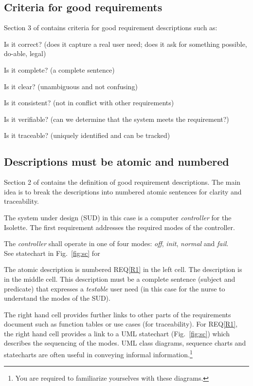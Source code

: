 \subsection{Criteria for good requirements}

Section 3 of \cite{telelogic} contains criteria for good requirement descriptions such as:

\begin{mylist}
\item Is it correct? (does it capture a real user need; does it ask for something possible, do-able, legal)
\item Is it complete? (a complete sentence)
\item Is it clear? (unambiguous and not confusing)
\item  Is it consistent? (not in conflict with other requirements)
\item  Is it verifiable? (can we determine that the system meets the requirement?)
\item Is it traceable? (uniquely identified and can be tracked)
\end{mylist}

\subsection{Descriptions must be atomic and numbered}
Section 2 of \cite{telelogic} contains the definition of good requirement descriptions. The main idea is to break the descriptions into numbered atomic sentences for clarity and traceability. 

The system under design (SUD) in this case is a computer \emph{controller} for the Isolette. The first requirement addresses the required modes of the controller.

{The \emph{controller} shall operate in one of four modes: \emph{off}, \emph{init}, \emph{normal} and \emph{fail}.\\}
{See statechart in Fig.~\ref{fig:sc} for }
\label{R1}



The atomic description is numbered REQ\ref{R1} in the left cell. The description is in the middle cell. This description must be a complete sentence (subject and predicate) that expresses a \emph{testable} user need (in this case for the nurse to understand the modes of the SUD). 

The right hand cell provides further links to other parts of the requirements document such as function tables or use cases (for traceability). For REQ\ref{R1}, the right hand cell provides a link to a UML statechart (Fig.~\ref{fig:sc}) which describes the sequencing of the modes. UML class diagrams, sequence charts and statecharts are often useful in conveying informal information.\footnote{%
You are required to familiarize yourselves with these diagrams.}

